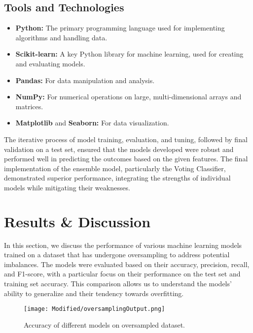 \documentclass[a4paper,num-refs,gigabyte]{oup-contemporary}
\begin{document}
\subsection{Tools and Technologies}
\begin{itemize}
    \item \textbf{Python:} The primary programming language used for implementing algorithms and handling data.
    \item \textbf{Scikit-learn:} A key Python library for machine learning, used for creating and evaluating models.
    \item \textbf{Pandas:} For data manipulation and analysis.
    \item \textbf{NumPy:} For numerical operations on large, multi-dimensional arrays and matrices.
    \item \textbf{Matplotlib} and \textbf{Seaborn:} For data visualization.
\end{itemize}

The iterative process of model training, evaluation, and tuning, followed by final validation on a test set, ensured that the models developed were robust and performed well in predicting the outcomes based on the given features. The final implementation of the ensemble model, particularly the Voting Classifier, demonstrated superior performance, integrating the strengths of individual models while mitigating their weaknesses.


\section*{Results \& Discussion}

In this section, we discuss the performance of various machine learning models trained on a dataset that has undergone oversampling to address potential imbalances. The models were evaluated based on their accuracy, precision, recall, and F1-score, with a particular focus on their performance on the test set and training set accuracy. This comparison allows us to understand the models' ability to generalize and their tendency towards overfitting.

\begin{figure}[ht]
    \centering
    \texttt{[image: Modified/oversamplingOutput.png]}
     \captionsetup{justification=centering, singlelinecheck=off} %
    \caption{Accuracy of different models on oversampled dataset.}
    \label{fig:Accuracy}
\end{figure}
\end{document}
